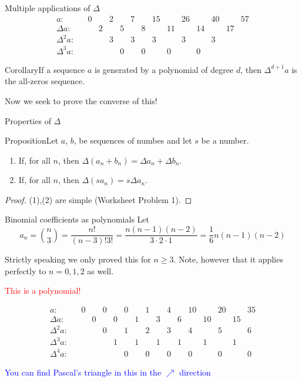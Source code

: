 \documentclass{beamer}
\def\bl[#1]#2{\begin{block}{#1}#2\end{block}}
\def\enumb{\begin{enumerate}}
\def\enume{\end{enumerate}}
\begin{document}
\begin{frame}{Multiple applications of $\Delta$}
\[
\begin{array}{rcccccccccccccc}
a:&&0&&2&&7&&15&&26&&40&&57\\
\Delta a:&&&2&&5&&8&&11&&14&&17&\\
\Delta^2 a:&&&&3&&3&&3&&3&&3&&\\
\Delta^3 a:&&&&&0&&0&&0&&0&&&
\end{array}
\]
\bl[Corollary]{If a sequence $a$ is generated by a polynomial of degree $d$, then $\Delta^{d+1}a$ is the all-zeros sequence.}
\center\color{red}Now we seek to prove the converse of this!
\end{frame}

\begin{frame}{Properties of $\Delta$}
\bl[Proposition]{Let $a$, $b$, be sequences of numbes and let $s$ be a number.
\enumb
\item If, for all $n$, then $\Delta (a_n+b_n)=\Delta a_n+\Delta b_n$.
\item If, for all $n$, then $\Delta(s a_n)=s\Delta a_n$.
\enume}
\begin{proof}
(1),(2) are simple (Worksheet Problem 1).
\end{proof}

\end{frame}

\begin{frame}{Binomial coefficients as polynomials}
Let 
\[
a_n=\binom{n}{3}=\frac{n!}{(n-3)!3!}=\frac{n(n-1)(n-2)}{3\cdot 2\cdot 1}=\frac{1}{6}n(n-1)(n-2)
\]

Strictly speaking we only proved this for $n\geq 3$. Note, however that it applies perfectly to $n=0,1,2$ as well.

\begin{center}{\textcolor{red}{This is a polynomial!}}
\end{center}
\[
\begin{array}{rcccccccccccccccc}
a:&&0&&0&&0&&1&&4&&10&&20&&35\\
\Delta a:&&&0&&0&&1&&3&&6&&10&&15\\
\Delta^2 a:&&&&0&&1&&2&&3&&4&&5&&6\\
\Delta^3 a:&&&&&1&&1&&1&&1&&1&&1\\
\Delta^4 a:&&&&&&0&&0&&0&&0&&0&&0
\end{array}
\]
\begin{center}\textcolor{blue}{You can find Pascal's triangle in this in the $\nearrow$ direction}\end{center}
\end{frame}
\end{document}
